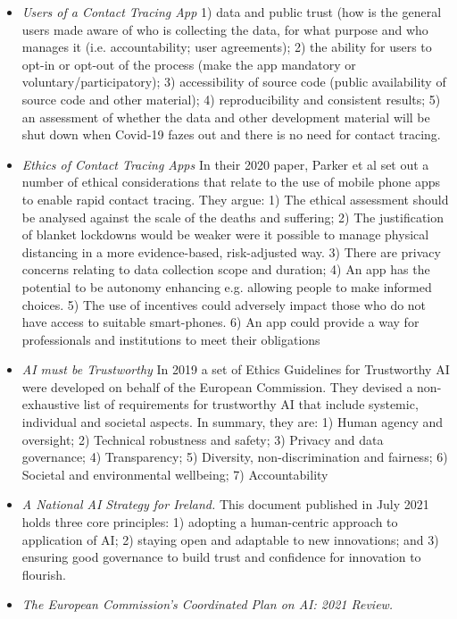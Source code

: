 \documentclass[conference]{IEEEtran}
\begin{document}
\begin{itemize}
\item {\emph{Users of a Contact Tracing App}} \cite{b3}
1) data and public trust (how is the general users made aware of who is collecting the data, for what purpose and who manages it (i.e. accountability; user agreements); 2) the ability for users to opt-in or opt-out of the process (make the app mandatory or voluntary/participatory); 3) accessibility of source code (public availability of source code and other material); 4) reproducibility and consistent results; 5) an assessment of whether the data and other development material will be shut down when Covid-19 fazes out and there is no need for contact tracing.

\item {\emph{Ethics of Contact Tracing Apps}}\cite{b3}
In their 2020 paper, Parker et al set out
a number of ethical considerations that relate to the use of mobile phone apps to enable rapid contact tracing. They argue: 1) The ethical assessment should be analysed against the scale of the deaths and suffering; 2) The justification of blanket lockdowns would be weaker were it possible to manage physical distancing in a more evidence-based, risk-adjusted way. 3) There are privacy concerns relating to data collection scope and duration; 4) An app has the potential to be autonomy enhancing e.g. allowing people to make informed choices. 5) The use of incentives could adversely impact those who do not have access to suitable smart-phones. 6) An app could provide a way for professionals and institutions to meet their obligations 
\item {\emph{AI must be Trustworthy}}\cite{b3}
In 2019 a set of Ethics Guidelines for Trustworthy AI were developed on behalf of the European Commission. They devised a non-exhaustive list of requirements for trustworthy AI that include systemic, individual and societal aspects. In summary, they are: 
1) Human agency and oversight;
2) Technical robustness and safety; 
3) Privacy and data governance; 4) Transparency; 
5) Diversity, non-discrimination and fairness;
6) Societal and environmental wellbeing;
7) Accountability 
\item {\emph{A National AI Strategy for Ireland.}}\cite{b3}
This document published in July 2021 holds three core principles: 1) adopting a human-centric approach to application of AI; 2) staying open and adaptable to new innovations; and 3) ensuring good governance to build trust and confidence for innovation to flourish. 
\item {\emph{The European Commission’s Coordinated Plan on AI: 2021 Review.}}\cite{b4}

\end{itemize}
\end{document}
